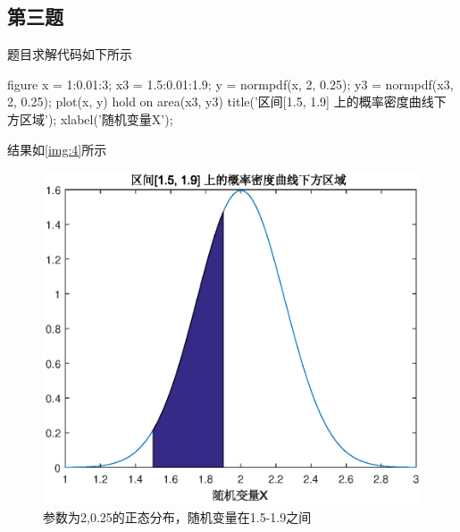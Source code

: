 \documentclass{article}
\begin{document}
\subsection{第三题}
题目求解代码如下所示
\begin{matlabcode}


    figure
    x = 1:0.01:3;
    x3 = 1.5:0.01:1.9;
    y = normpdf(x, 2, 0.25);
    y3 = normpdf(x3, 2, 0.25);
    plot(x, y) %
    hold on %
    area(x3, y3) %
    title('区间[1.5, 1.9] 上的概率密度曲线下方区域');
    xlabel('随机变量X');

\end{matlabcode}

结果如\autoref{img:4}所示
\begin{figure}[t]
\includegraphics[width=.5\textwidth]{4.eps}
\centering
\caption{参数为2,0.25的正态分布，随机变量在1.5-1.9之间} 
\label{img:4}
\end{figure}
\end{document}
